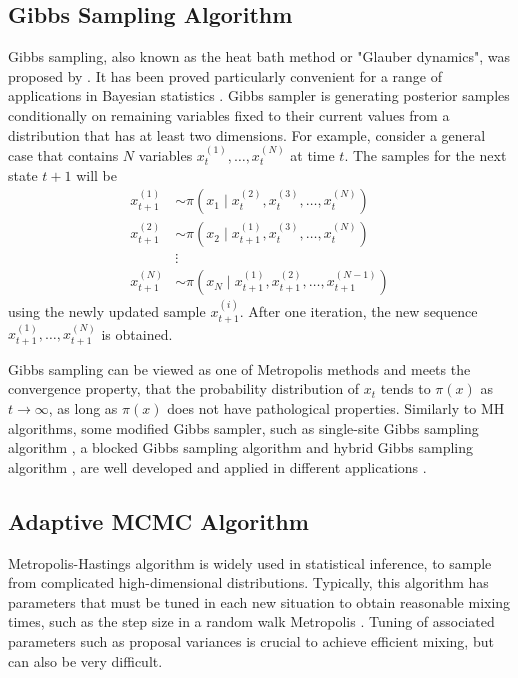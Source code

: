 \subsection*{Gibbs Sampling Algorithm}

Gibbs sampling, also known as the heat bath method or "Glauber dynamics", was proposed by \cite{geman1984stochastic}. It has been proved particularly convenient for a range of applications in Bayesian statistics \cite{smith1993bayesian} \cite{mackay2003information}. Gibbs sampler is generating posterior samples conditionally on remaining variables fixed to their current values from a distribution that has at least two dimensions. For example, consider a general case that contains $N$ variables $x_t^{(1)},\ldots,x_t^{(N)}$ at time $t$. The samples for the next state $t+1$ will be 
\begin{align*}
x_{t+1}^{(1)}  &\sim \pi(x_1 \mid x_t^{(2)},x_t^{(3)},\ldots,x_t^{(N)}) \\
x_{t+1}^{(2)}  &\sim \pi(x_2 \mid x_{t+1}^{(1)},x_t^{(3)},\ldots,x_t^{(N)}) \\
&\vdots \\
x_{t+1}^{(N)}  &\sim \pi(x_N \mid x_{t+1}^{(1)},x_{t+1}^{(2)},\ldots,x_{t+1}^{(N-1)})
\end{align*}
using the newly updated sample $x_{t+1}^{(i)}$. After one iteration, the new sequence $x_{t+1}^{(1)},\ldots,x_{t+1}^{(N)}$ is obtained. 

Gibbs sampling can be viewed as one of Metropolis methods and meets the convergence property, that the probability distribution of $x_t$ tends to $\pi(x)$ as $t\to\infty$, as long as $\pi(x)$ does not have pathological properties. Similarly to MH algorithms, some modified Gibbs sampler, such as single-site Gibbs sampling algorithm \cite{sorensen2007likelihood}, a blocked Gibbs sampling algorithm \cite{garcia1996multivariate} and hybrid Gibbs sampling algorithm \cite{mathew2012bayesian}, are well developed and applied in different applications \cite{gelfand1990illustration}. 



\subsection*{Adaptive MCMC Algorithm}


Metropolis-Hastings algorithm is widely used in statistical inference, to sample from complicated high-dimensional distributions. Typically, this algorithm has parameters that must be tuned in each new situation to obtain reasonable mixing times, such as the step size in a random walk Metropolis \cite{mahendran2012adaptive}. Tuning of associated parameters such as proposal variances is crucial to achieve efficient mixing, but can also be very difficult. 

